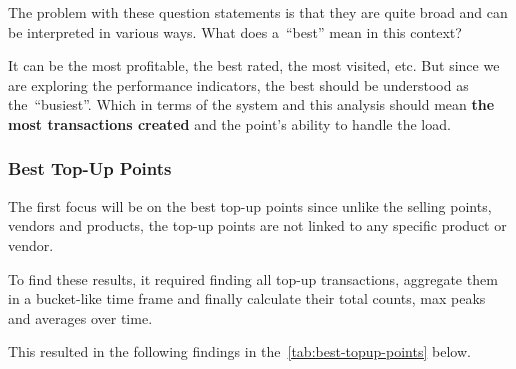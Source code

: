 The problem with these question statements is that they are quite broad and can be interpreted in various ways.
What does a~\enquote{best} mean in this context?

It can be the most profitable, the best rated, the most visited, etc.
But since we are exploring the performance indicators, the best should be understood as the~\enquote{busiest}.
Which in terms of the system and this analysis should mean \textbf{the most transactions created} and the point's ability to handle the load.


\subsubsection{Best Top-Up Points}
\label{subsubsec:analysis-best-top-up-points}

The first focus will be on the best top-up points since unlike the selling points, vendors and products, the top-up points are not linked to any specific product or vendor.


To find these results, it required finding all top-up transactions, aggregate them in a bucket-like time frame and finally calculate their total counts, max peaks and averages over time.

This resulted in the following findings in the~\autoref{tab:best-topup-points} below.

